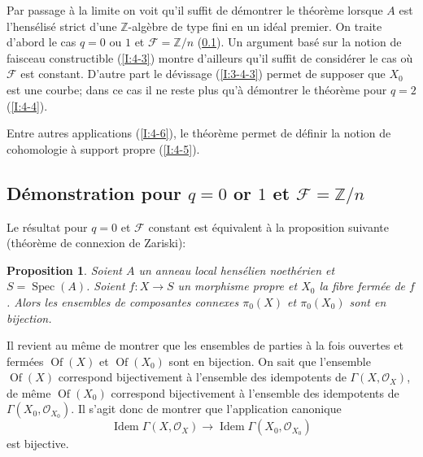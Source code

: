 \documentclass{book}
\DeclareMathOperator{\spec}{Spec}
\newcommand{\cF}{\mathcal{F}}
\newcommand{\cO}{\mathcal{O}}
\newcommand{\dZ}{\mathbb{Z}}
\newtheorem{proposition}[subsubsection]{Proposition}
\begin{document}
Par passage à la limite on voit qu'il suffit de démontrer le théorème 
lorsque $A$ est l'hensélisé strict d'une $\dZ$-algèbre  de type fini en 
un idéal premier. On traite d'abord le cas $q=0$ ou $1$ et $\cF=\dZ/n$ 
(\ref{I:4-2}). Un argument basé sur la notion de faisceau constructible 
(\ref{I:4-3}) montre d'ailleurs qu'il suffit de considérer le cas où $\cF$ est 
constant. D'autre part le dévissage (\ref{I:3-4-3}) permet de supposer que 
$X_0$ est une courbe; dans ce cas il ne reste plus qu'à démontrer le 
théorème pour $q=2$ (\ref{I:4-4}). 

Entre autres applications (\ref{I:4-6}), le théorème permet de définir la notion 
de cohomologie à support propre (\ref{I:4-5}). 










\subsection{Démonstration pour \texorpdfstring{$q=0$}{q=1} or \texorpdfstring{$1$}{1} et \texorpdfstring{$\cF=\dZ/n$}{\cF=Z/n}}\label{I:4-2} 

Le résultat pour $q=0$ et $\cF$ constant est équivalent à la proposition 
suivante (théorème de connexion de Zariski):





\begin{proposition}\label{I:4-2-1}
Soient $A$ un anneau local hensélien noethérien et $S=\spec(A)$. 
Soient $f:X\to S$ un morphisme propre et $X_0$ la fibre fermée de $f$. Alors 
les ensembles de composantes connexes $\pi_0(X)$ et $\pi_0(X_0)$ sont en 
bijection.
\end{proposition}

Il revient au même de montrer que les ensembles de parties à la fois 
ouvertes et fermées $\operatorname{Of}(X)$ et $\operatorname{Of}(X_0)$ sont 
en bijection. On sait que l'ensemble $\operatorname{Of}(X)$ correspond 
bijectivement à l'ensemble des idempotents de $\Gamma(X,\cO_X)$, de même 
$\operatorname{Of}(X_0)$ correspond bijectivement à l'ensemble des 
idempotents de $\Gamma(X_0,\cO_{X_0})$. Il s'agit donc de montrer que 
l'application canonique 
\[
  \operatorname{Idem} \Gamma(X,\cO_X) \to \operatorname{Idem}\Gamma(X_0,\cO_{X_0})
\]
est bijective. 
\end{document}
